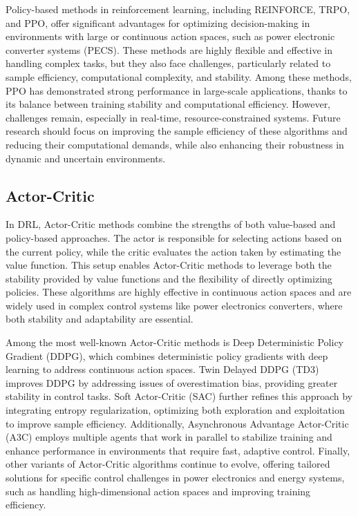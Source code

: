 Policy-based methods in reinforcement learning, including REINFORCE, TRPO, and PPO, offer significant advantages for optimizing decision-making in environments with large or continuous action spaces, such as power electronic converter systems (PECS). These methods are highly flexible and effective in handling complex tasks, but they also face challenges, particularly related to sample efficiency, computational complexity, and stability. Among these methods, PPO has demonstrated strong performance in large-scale applications, thanks to its balance between training stability and computational efficiency. However, challenges remain, especially in real-time, resource-constrained systems. Future research should focus on improving the sample efficiency of these algorithms and reducing their computational demands, while also enhancing their robustness in dynamic and uncertain environments. 

\subsection{Actor-Critic}
\label{sec:ac_methods}

In DRL, Actor-Critic methods combine the strengths of both value-based and policy-based approaches. The actor is responsible for selecting actions based on the current policy, while the critic evaluates the action taken by estimating the value function. This setup enables Actor-Critic methods to leverage both the stability provided by value functions and the flexibility of directly optimizing policies. These algorithms are highly effective in continuous action spaces and are widely used in complex control systems like power electronics converters, where both stability and adaptability are essential.

Among the most well-known Actor-Critic methods is Deep Deterministic Policy Gradient (DDPG), which combines deterministic policy gradients with deep learning to address continuous action spaces. Twin Delayed DDPG (TD3) improves DDPG by addressing issues of overestimation bias, providing greater stability in control tasks. Soft Actor-Critic (SAC) further refines this approach by integrating entropy regularization, optimizing both exploration and exploitation to improve sample efficiency. Additionally, Asynchronous Advantage Actor-Critic (A3C) employs multiple agents that work in parallel to stabilize training and enhance performance in environments that require fast, adaptive control. Finally, other variants of Actor-Critic algorithms continue to evolve, offering tailored solutions for specific control challenges in power electronics and energy systems, such as handling high-dimensional action spaces and improving training efficiency.


